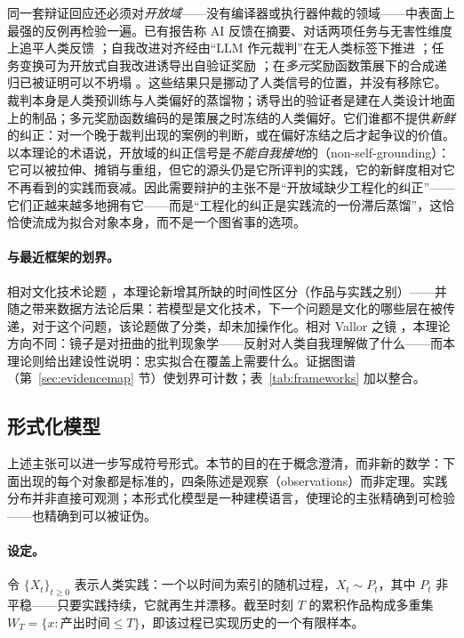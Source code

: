 \documentclass[10pt,fontset=fandol]{ctexart}
\begin{document}
同一套辩证回应还必须对\emph{开放域}——没有编译器或执行器仲裁的领域——中表面上最强的反例再检验一遍。已有报告称 AI 反馈在摘要、对话两项任务与无害性维度上追平人类反馈 \cite{lee2023rlaif}；自我改进对齐经由“LLM 作元裁判”在无人类标签下推进 \cite{wu2024metarewarding}；任务变换可为开放式自我改进诱导出自验证奖励 \cite{wang2026rlsvr}；在\emph{多元}奖励函数策展下的合成递归已被证明可以不坍塌 \cite{falahati2026pluralistic}。这些结果只是挪动了人类信号的位置，并没有移除它。裁判本身是人类预训练与人类偏好的蒸馏物；诱导出的验证者是建在人类设计地面上的制品；多元奖励函数编码的是策展之时冻结的人类偏好。它们谁都不提供\emph{新鲜}的纠正：对一个晚于裁判出现的案例的判断，或在偏好冻结之后才起争议的价值。以本理论的术语说，开放域的纠正信号是\emph{不能自我接地}的（non-self-grounding）：它可以被拉伸、摊销与重组，但它的源头仍是它所评判的实践，它的新鲜度相对它不再看到的实践而衰减。因此需要辩护的主张不是“开放域缺少工程化的纠正”——它们正越来越多地拥有它——而是“工程化的纠正是实践流的一份滞后蒸馏”，这恰恰使流成为拟合对象本身，而不是一个图省事的选项。

\paragraph{与最近框架的划界。}
相对文化技术论题 \cite{farrell2025cultural}，本理论新增其所缺的时间性区分（作品与实践之别）——并随之带来数据方法论后果：若模型是文化技术，下一个问题是文化的哪些层在被传递，对于这个问题，该论题做了分类，却未加操作化。相对 Vallor 之镜 \cite{vallor2024mirror}，本理论方向不同：镜子是对扭曲的批判现象学——反射对人类自我理解做了什么——而本理论则给出建设性说明：忠实拟合在覆盖上需要什么。证据图谱（第~\ref{sec:evidencemap} 节）使划界可计数；表~\ref{tab:frameworks} 加以整合。

\subsection{形式化模型}\label{sec:formalsketch}

上述主张可以进一步写成符号形式。本节的目的在于概念澄清，而非新的数学：下面出现的每个对象都是标准的，四条陈述是观察（observations）而非定理。实践分布并非直接可观测；本形式化模型是一种建模语言，使理论的主张精确到可检验——也精确到可以被证伪。

\paragraph{设定。} 令 $\{X_t\}_{t \geq 0}$ 表示人类实践：一个以时间为索引的随机过程，$X_t \sim P_t$，其中 $P_t$ 非平稳——只要实践持续，它就再生并漂移。截至时刻 $T$ 的累积作品构成多重集 $W_T = \{x : \text{产出时间} \leq T\}$，即该过程已实现历史的一个有限样本。
\end{document}
